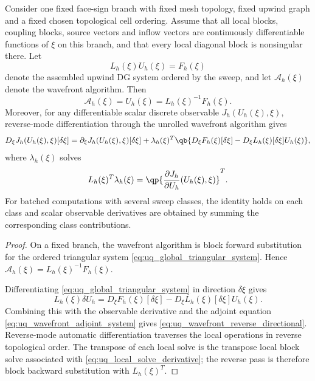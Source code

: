 \documentclass[final]{amsart}
\begin{document}
\begin{proposition}
\label{prop:uq_reverse_mode_wavefront_adjoint}
Consider one fixed face-sign branch with fixed mesh topology, fixed
upwind graph and a fixed chosen topological cell ordering. Assume that
all local blocks, coupling blocks, source vectors and inflow vectors
are continuously differentiable functions of $\xi$ on this branch, and
that every local diagonal block is nonsingular there. Let
\begin{equation}
  L_h(\xi)U_h(\xi)=F_h(\xi)
  \label{eq:uq_global_triangular_system}
\end{equation}
denote the assembled upwind DG system ordered by the sweep, and let
$\mathcal{A}_h(\xi)$ denote the wavefront algorithm. Then
\begin{equation}
  \mathcal{A}_h(\xi)=U_h(\xi)=L_h(\xi)^{-1}F_h(\xi).
\end{equation}
Moreover, for any differentiable scalar discrete observable
$J_h(U_h(\xi),\xi)$, reverse-mode differentiation through the unrolled
wavefront algorithm gives
\begin{equation}
  D_\xi J_h(U_h(\xi),\xi)[\delta\xi]
  =
  \partial_\xi J_h(U_h(\xi),\xi)[\delta\xi]
  +
  \lambda_h(\xi)^T
  \qb{
    D_\xi F_h(\xi)[\delta\xi]
    -
    D_\xi L_h(\xi)[\delta\xi]U_h(\xi)
  },
  \label{eq:uq_wavefront_reverse_directional}
\end{equation}
where $\lambda_h(\xi)$ solves
\begin{equation}
  L_h(\xi)^T\lambda_h(\xi)
  =
  \qp{
    \frac{\partial J_h}{\partial U_h}(U_h(\xi),\xi)
  }^T.
  \label{eq:uq_wavefront_adjoint_system}
\end{equation}
For batched computations with several sweep classes, the identity holds
on each class and scalar observable derivatives are obtained by summing
the corresponding class contributions.
\end{proposition}

\begin{proof}
On a fixed branch, the wavefront algorithm is block forward
substitution for the ordered triangular system
\eqref{eq:uq_global_triangular_system}. Hence
$\mathcal{A}_h(\xi)=L_h(\xi)^{-1}F_h(\xi)$.

Differentiating \eqref{eq:uq_global_triangular_system} in direction
$\delta\xi$ gives
\begin{equation}
  L_h(\xi)\delta U_h
  =
  D_\xi F_h(\xi)[\delta\xi]
  -
  D_\xi L_h(\xi)[\delta\xi]U_h(\xi).
  \label{eq:uq_wavefront_forward_directional}
\end{equation}
Combining this with the observable derivative and the adjoint equation
\eqref{eq:uq_wavefront_adjoint_system} gives
\eqref{eq:uq_wavefront_reverse_directional}. Reverse-mode automatic
differentiation traverses the local operations in reverse topological
order. The transpose of each local solve is the transpose local block
solve associated with \eqref{eq:uq_local_solve_derivative}; the reverse
pass is therefore block backward substitution with $L_h(\xi)^T$.
\end{proof}
\end{document}

